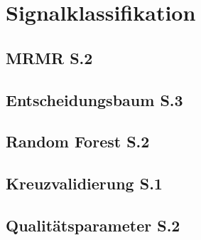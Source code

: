 \thispagestyle{plain}
\chapter{Signalklassifikation}
\section{MRMR S.2}
\section{Entscheidungsbaum S.3}
\section{Random Forest S.2}
\section{Kreuzvalidierung S.1}
\section{Qualitätsparameter S.2}